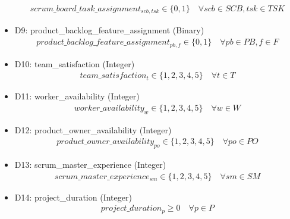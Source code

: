 \documentclass{article}
\begin{document}
\begin{itemize}
        \begin{align*}
            scrum\_board\_task\_assignment_{scb, tsk} \in \{0, 1\} \quad \forall scb \in SCB, tsk \in TSK
        \end{align*}
    \item D9: product\_backlog\_feature\_assignment (Binary)
        \begin{align*}
            product\_backlog\_feature\_assignment_{pb, f} \in \{0, 1\} \quad \forall pb \in PB, f \in F
        \end{align*}
    \item D10: team\_satisfaction (Integer)
        \begin{align*}
            team\_satisfaction_{t} \in \{1, 2, 3, 4, 5\} \quad \forall t \in T
        \end{align*}
    \item D11: worker\_availability (Integer)
        \begin{align*}
            worker\_availability_{w} \in \{1, 2, 3, 4, 5\} \quad \forall w \in W
        \end{align*}
    \item D12: product\_owner\_availability (Integer)
        \begin{align*}
            product\_owner\_availability_{po} \in \{1, 2, 3, 4, 5\} \quad \forall po \in PO
        \end{align*}
    \item D13: scrum\_master\_experience (Integer)
        \begin{align*}
            scrum\_master\_experience_{sm} \in \{1, 2, 3, 4, 5\} \quad \forall sm \in SM
        \end{align*}
    \item D14: project\_duration (Integer)
        \begin{align*}
            project\_duration_{p} \geq 0 \quad \forall p \in P
        \end{align*}
\end{itemize}
\end{document}
